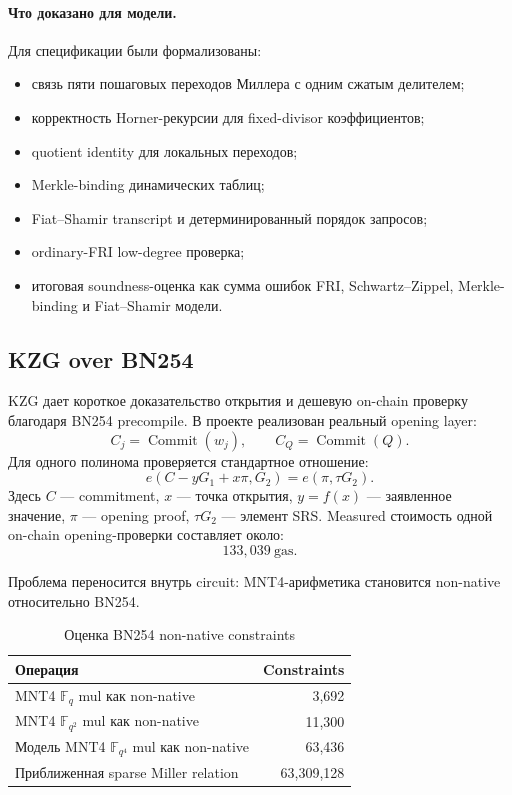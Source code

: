 \documentclass[12pt,a4paper]{article}
\newcommand{\Fq}{\mathbb{F}_q}
\newcommand{\Gas}{\mathrm{gas}}
\begin{document}
\paragraph{Что доказано для модели.}
Для спецификации были формализованы:
\begin{itemize}
    \item связь пяти пошаговых переходов Миллера с одним сжатым делителем;
    \item корректность Horner-рекурсии для fixed-divisor коэффициентов;
    \item quotient identity для локальных переходов;
    \item Merkle-binding динамических таблиц;
    \item Fiat--Shamir transcript и детерминированный порядок запросов;
    \item ordinary-FRI low-degree проверка;
    \item итоговая soundness-оценка как сумма ошибок FRI,
    Schwartz--Zippel, Merkle-binding и Fiat--Shamir модели.
\end{itemize}

\subsection{KZG over BN254}

KZG дает короткое доказательство открытия и дешевую on-chain проверку благодаря
BN254 precompile. В проекте реализован реальный opening layer:
\[
    C_j=\operatorname{Commit}(w_j),\qquad
    C_Q=\operatorname{Commit}(Q).
\]
Для одного полинома проверяется стандартное отношение:
\[
    e(C-yG_1+x\pi,G_2)=e(\pi,\tau G_2).
\]
Здесь $C$ --- commitment, $x$ --- точка открытия, $y=f(x)$ ---
заявленное значение, $\pi$ --- opening proof, $\tau G_2$ --- элемент SRS.
Measured стоимость одной on-chain opening-проверки составляет около:
\[
    133{,}039\ \Gas.
\]

Проблема переносится внутрь circuit: MNT4-арифметика становится non-native
относительно BN254.

\begin{table}[htbp]
\centering
\caption{Оценка BN254 non-native constraints}
\small
\begin{tabular}{l r}
\toprule
Операция & Constraints \\
\midrule
MNT4 $\Fq$ mul как non-native & 3,692 \\
MNT4 $\mathbb{F}_{q^2}$ mul как non-native & 11,300 \\
Модель MNT4 $\mathbb{F}_{q^4}$ mul как non-native & 63,436 \\
Приближенная sparse Miller relation & 63,309,128 \\
\bottomrule
\end{tabular}
\end{table}
\end{document}
